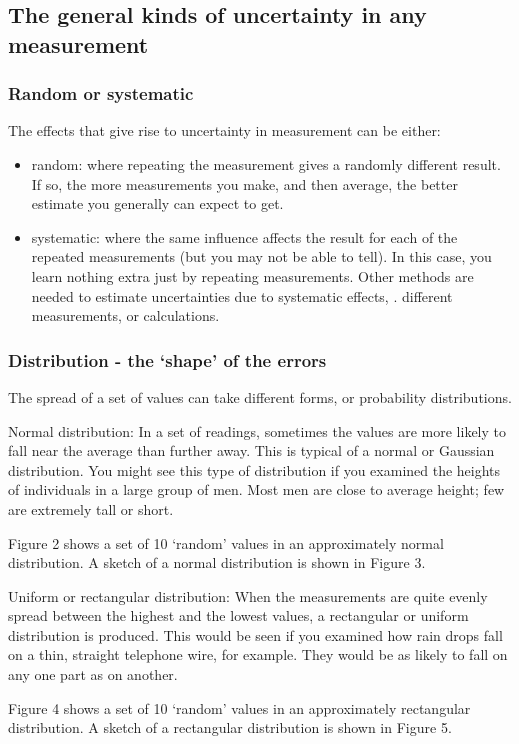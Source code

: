 \subsection{The general kinds of uncertainty in any measurement}
\subsubsection{Random or systematic}
The effects that give rise to uncertainty in measurement can be either:
\begin{itemize}
\item random: where repeating the measurement gives a randomly different result. If so, the more measurements you make, and then average, the better estimate you generally can expect to get.
%
\item systematic: where the same influence affects the result for each of the repeated measurements (but you may not be able to tell). In this case, you learn nothing extra just by repeating measurements. Other methods are needed to estimate uncertainties due to systematic effects, \eg. different measurements, or calculations.
\end{itemize}

\subsubsection{Distribution - the `shape' of the errors}
The spread of a set of values can take different forms, or probability distributions.

Normal distribution: In a set of readings, sometimes the values are more likely to fall near the average than further away. This is typical of a normal or Gaussian distribution. You might see this type of distribution if you examined the heights of individuals in a large group of men. Most men are close to average height; few are extremely tall or short.

Figure 2 shows a set of 10 `random' values in an approximately normal distribution. A sketch of a normal distribution is shown in Figure 3.

Uniform or rectangular distribution: When the measurements are quite evenly spread between the highest and the lowest values, a rectangular or uniform distribution is produced. This would be seen if you examined how rain drops fall on a thin, straight telephone wire, for example. They would be as likely to fall on any one part as on another.

Figure 4 shows a set of 10 `random' values in an approximately rectangular distribution. A sketch of a rectangular distribution is shown in Figure 5.


